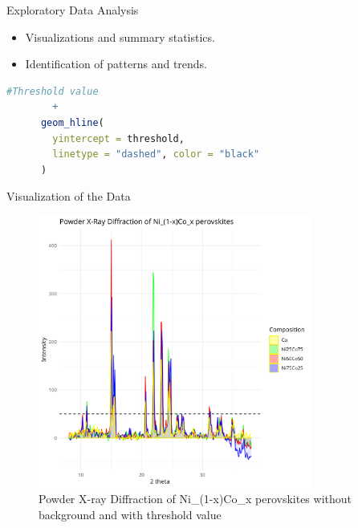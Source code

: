\documentclass{beamer}
\begin{document}
\begin{frame}[fragile]{Exploratory Data Analysis}
    \begin{itemize}
        \item Visualizations and summary statistics.
        \item Identification of patterns and trends.
    \end{itemize}

    \begin{lstlisting}[language=R, basicstyle=\tiny\ttfamily]
      #Threshold value
        +
      geom_hline(
        yintercept = threshold,
        linetype = "dashed", color = "black"
      )
    \end{lstlisting}
\end{frame}

\begin{frame}{Visualization of the Data}
    \begin{figure}
        \centering
        \includegraphics[width=0.8\textwidth]{../plot/graph.png}
        \caption{Powder X-ray Diffraction of Ni\_(1-x)Co\_x perovskites without background and with threshold value}
        \label{fig:xrd}
    \end{figure}
\end{frame}
\end{document}
